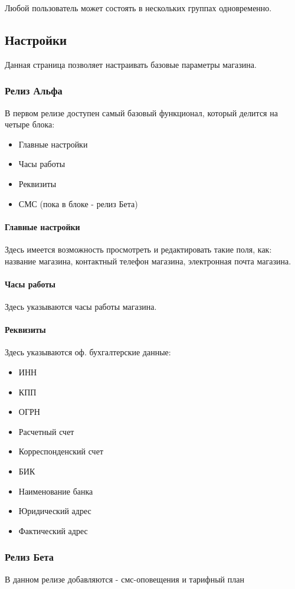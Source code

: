 \documentclass[DIV=calc, paper=a4, fontsize=11pt]{scrartcl} %
\begin{document}
Любой пользователь может состоять в нескольких группах одновременно.

\subsection{Настройки}

Данная страница позволяет настраивать базовые параметры магазина.

\subsubsection{Релиз Альфа}

В первом релизе доступен самый базовый функционал, который делится на четыре блока:

\begin{itemize}
	\item Главные настройки
	\item Часы работы
	\item Реквизиты
	\item СМС (пока в блоке - релиз Бета)
\end{itemize}

\paragraph{Главные настройки}
Здесь имеется возможность просмотреть и редактировать такие поля, как: название магазина, контактный телефон магазина, электронная почта магазина.

\paragraph{Часы работы}
Здесь указываются часы работы магазина.

\paragraph{Реквизиты}
Здесь указываются оф. бухгалтерские данные:

\begin{itemize}
	\item ИНН
	\item КПП
	\item ОГРН
	\item Расчетный счет
	\item Корреспонденский счет
	\item БИК
	\item Наименование банка
	\item Юридический адрес
	\item Фактический адрес
\end{itemize}

\subsubsection{Релиз Бета}

В данном релизе добавляются - смс-оповещения и тарифный план 
\end{document}
